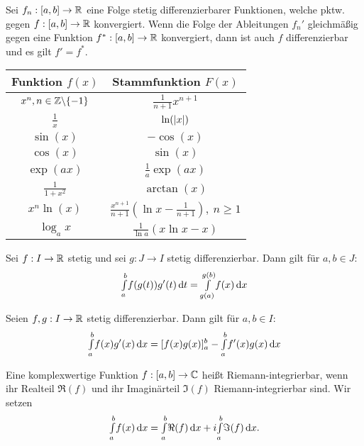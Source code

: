\documentclass{cheat-sheet}
\begin{document}
\begin{satz}
Sei $f_n : \left[ a, b \right] \to \mathbb{R}$ eine Folge stetig differenzierbarer Funktionen, welche pktw. gegen $f : \left[ a, b \right] \to \mathbb{R}$ konvergiert. Wenn die Folge der Ableitungen $f_n'$ gleichmäßig gegen eine Funktion $f^{*} : \left[ a, b \right] \to \mathbb{R}$ konvergiert, dann ist auch $f$ differenzierbar und es gilt $f' = f^{*}$.
\end{satz}

\center
\begin{tabular}{ | c | c | }
  \hline
  Funktion $f(x)$ & Stammfunktion $F(x)$ \\ \hline \hline
  $x^n, n \in \mathbb{Z}\backslash\{-1\}$ & $\tfrac{1}{n+1}x^{n+1}$ \\ \hline
  $\tfrac{1}{x}$ & $\ln(\lvert x\rvert)$ \\ \hline
  $\sin(x)$ & $-\cos(x)$ \\ \hline
  $\cos(x)$ & $\sin(x)$ \\ \hline
  $\exp(ax)$ & $\tfrac{1}{a}\exp(ax)$ \\ \hline
  $\tfrac{1}{1 + x^2}$ & $\arctan(x)$ \\ \hline
  $x^n \ln(x)$ & $\tfrac{x^{n+1}}{n+1}(\ln x - \tfrac{1}{n+1}),\ n \ge 1$ \\ \hline
  $\log_a x$ & $\tfrac{1}{\ln a}(x \ln x - x)$ \\ \hline
\end{tabular}

\begin{satz}
Sei $f : I \to \mathbb{R}$ stetig und sei $g : J \to I$ stetig differenzierbar. Dann gilt für $a, b \in J$:
\[ {\textstyle \int\limits_{a}^{b}} f(g(t))g'(t) \,\mathrm{d} t = {\textstyle \int\limits_{g(a)}^{g(b)}} f(x) \,\mathrm{d} x \]
\end{satz}

\begin{satz}
Seien $f, g : I \to \mathbb{R}$ stetig differenzierbar. Dann gilt für $a, b \in I$:
\[ {\textstyle \int\limits_{a}^{b}} f(x)g'(x) \,\mathrm{d} x = [f(x)g(x)]_a^b - {\textstyle \int\limits_{a}^{b}} f'(x)g(x) \,\mathrm{d} x \]
\end{satz}

\begin{defn}
Eine komplexwertige Funktion $f : \left[ a, b \right] \to \mathbb{C}$ heißt Riemann-integrierbar, wenn ihr Realteil $\Re(f)$ und ihr Imaginärteil $\Im(f)$ Riemann-integrierbar sind. Wir setzen
\[ {\textstyle \int\limits_{a}^{b}} f(x) \,\mathrm{d} x = {\textstyle \int\limits_{a}^{b}} \Re(f) \,\mathrm{d} x + i {\textstyle \int\limits_{a}^{b}} \Im(f) \,\mathrm{d} x. \]
\end{defn}
\end{document}
